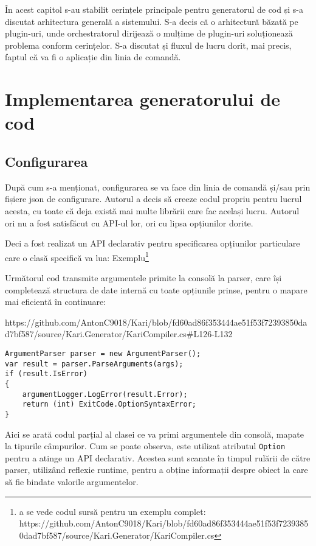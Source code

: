 \documentclass{report}
\begin{document}
În acest capitol s-au stabilit cerințele principale pentru generatorul de cod și s-a discutat arhitectura generală a sistemului.
S-a decis că o arhitectură băzată pe plugin-uri, unde orchestratorul dirijează o mulțime de plugin-uri soluționează problema conform cerințelor.
S-a discutat și fluxul de lucru dorit, mai precis, faptul că va fi o aplicație din linia de comandă.


\chapter{Implementarea generatorului de cod}

\section{Configurarea}

După cum s-a menționat, configurarea se va face din linia de comandă și/sau prin fișiere json de configurare.
Autorul a decis să creeze codul propriu pentru lucrul acesta, cu toate că deja există mai multe librării care fac același lucru.
Autorul ori nu a fost satisfăcut cu API-ul lor, ori cu lipsa opțiunilor dorite.

Deci a fost realizat un API declarativ pentru specificarea opțiunilor particulare care o clasă specifică va lua:
Exemplu\footnote{a se vede codul sursă pentru un exemplu complet:
https://github.com/AntonC9018/Kari/blob/fd60ad86f353444ae51f53f72393850dad7bf587/source/Kari.Generator/KariCompiler.cs
}

Următorul cod transmite argumentele primite la consolă la parser, care își completează structura de date internă cu toate opțiunile prinse, pentru o mapare mai eficientă în continuare:


https://github.com/AntonC9018/Kari/blob/fd60ad86f353444ae51f53f72393850dad7bf587/source/Kari.Generator/KariCompiler.cs#L126-L132

\begin{lstlisting}
ArgumentParser parser = new ArgumentParser();
var result = parser.ParseArguments(args);
if (result.IsError)
{
    argumentLogger.LogError(result.Error);
    return (int) ExitCode.OptionSyntaxError;
}
\end{lstlisting}

Aici se arată codul parțial al clasei ce va primi argumentele din consolă, mapate la tipurile câmpurilor.
Cum se poate observa, este utilizat atributul \texttt{Option} pentru a atinge un API declarativ.
Acestea sunt scanate în timpul rulării de către parser, utilizând reflexie runtime, pentru a obține informații despre obiect la care să fie bindate valorile argumentelor. 
\end{document}
